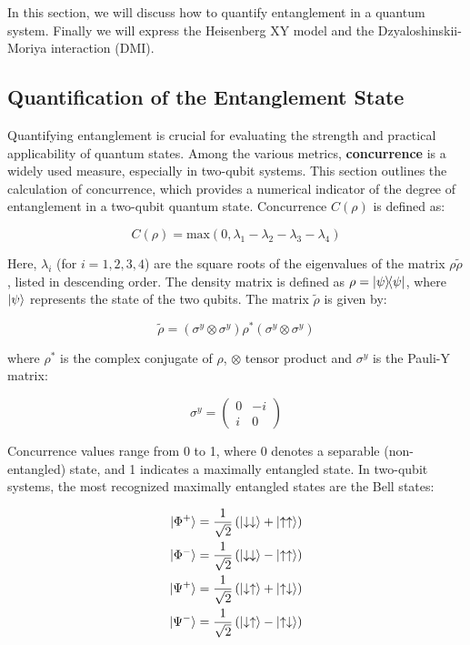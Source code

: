 In this section, 
we will discuss how to quantify 
entanglement in a quantum system.
Finally we will express the Heisenberg XY model   and 
the Dzyaloshinskii-Moriya interaction (DMI).



\subsection{Quantification of the Entanglement State}


Quantifying entanglement is crucial for 
evaluating the strength and practical 
applicability of quantum states. 
Among the various metrics, \textbf{concurrence} \cite{wootters_entanglement_1998}
is a widely used measure, especially in two-qubit 
systems. 
This section outlines the calculation 
of concurrence, which provides a numerical 
indicator of the degree of entanglement 
in a two-qubit quantum state. 
Concurrence \(C(\rho)\) is defined as:

\begin{equation}\label{def: concurrence}
    C(\rho) = \text{max}\left(0, \lambda_1 - 
\lambda_2 - \lambda_3 - \lambda_4\right)
\end{equation}

Here, \(\lambda_i\) (for \(i = 1, 2, 3, 4\)) are the square roots of the eigenvalues 
of the matrix \(\rho \tilde{\rho}\), listed in descending order. 
The density matrix is defined as \(\rho = \ketbra{\psi}{\psi}\),
where \(\ket{\psi}\) represents the state of the two qubits. The matrix \(\tilde{\rho}\) is given by:


\[
\tilde{\rho} = \left(\sigma^y 
\otimes \sigma^y\right) \rho^* 
\left(\sigma^y \otimes \sigma^y\right)
\]

where \(\rho^*\) is the complex conjugate of \(\rho\), $\otimes$ tensor product and \(\sigma^y\) is the Pauli-Y matrix:

\[
\sigma^y = \begin{pmatrix}
0 & -i \\
i & 0
\end{pmatrix}
\]

Concurrence values range from 0 to 1, 
where 0 denotes a separable (non-entangled) state, 
and 1 indicates a maximally entangled state. In two-qubit systems, 
the most recognized maximally entangled states are the Bell states:


\[
\begin{aligned}
    |\Phi^+\rangle &= \frac{1}{\sqrt{2}} \left( \ket{\downarrow\downarrow} + \ket{\uparrow\uparrow} \right) \\
    |\Phi^-\rangle &= \frac{1}{\sqrt{2}} \left( \ket{\downarrow\downarrow} - \ket{\uparrow\uparrow} \right) \\
    |\Psi^+\rangle &= \frac{1}{\sqrt{2}} \left( \ket{\downarrow\uparrow} + \ket{\uparrow\downarrow} \right) \\
    |\Psi^-\rangle &= \frac{1}{\sqrt{2}} \left( \ket{\downarrow\uparrow} - \ket{\uparrow\downarrow} \right)
\end{aligned}
\]



